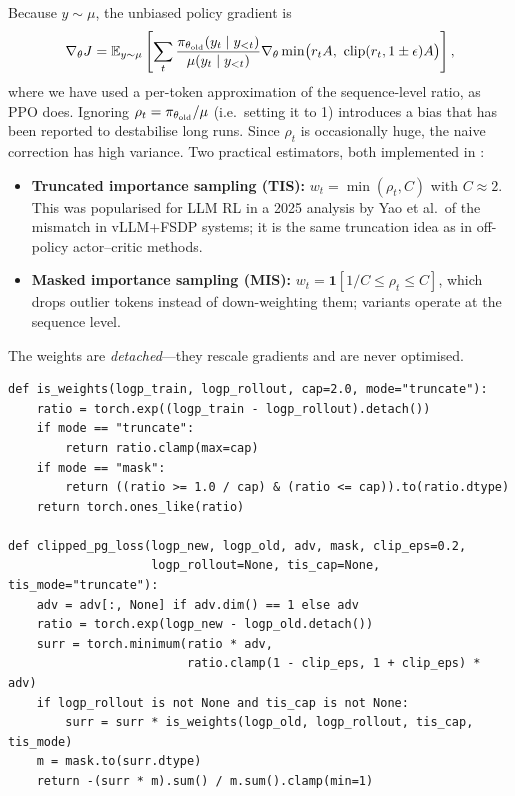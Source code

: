 Because $y\sim\mu$, the unbiased policy gradient is
\begin{equation}
\nabla_\theta J = \mathbb{E}_{y\sim\mu}\left[\sum_t \frac{\pi_{\theta_{\text{old}}}(y_t\mid y_{<t})}{\mu(y_t\mid y_{<t})}
\nabla_\theta \min\!\big(r_t A,\ \operatorname{clip}(r_t,1\pm\epsilon) A\big)\right],
\end{equation}
where we have used a per-token approximation of the sequence-level ratio, as PPO does.
Ignoring $\rho_t = \pi_{\theta_{\text{old}}}/\mu$ (i.e.\ setting it to 1) introduces a bias that has been
reported to destabilise long runs. Since $\rho_t$ is occasionally huge, the naive correction
has high variance. Two practical estimators, both implemented in
:
\begin{itemize}
\item \textbf{Truncated importance sampling (TIS):} $w_t = \min(\rho_t, C)$ with $C\approx 2$.
This was popularised for LLM RL in a 2025 analysis by Yao et al.\ of the mismatch in
vLLM+FSDP systems; it is the same truncation idea as in off-policy actor--critic methods.
\item \textbf{Masked importance sampling (MIS):} $w_t = \mathbf{1}[1/C\le\rho_t\le C]$, which
drops outlier tokens instead of down-weighting them; variants operate at the sequence level.
\end{itemize}
The weights are \emph{detached}---they rescale gradients and are never optimised.

\begin{lstlisting}[caption={Clipped surrogate with truncated importance-sampling correction.},
label={lst:rlsys:tis}]
def is_weights(logp_train, logp_rollout, cap=2.0, mode="truncate"):
    ratio = torch.exp((logp_train - logp_rollout).detach())
    if mode == "truncate":
        return ratio.clamp(max=cap)
    if mode == "mask":
        return ((ratio >= 1.0 / cap) & (ratio <= cap)).to(ratio.dtype)
    return torch.ones_like(ratio)

def clipped_pg_loss(logp_new, logp_old, adv, mask, clip_eps=0.2,
                    logp_rollout=None, tis_cap=None, tis_mode="truncate"):
    adv = adv[:, None] if adv.dim() == 1 else adv
    ratio = torch.exp(logp_new - logp_old.detach())
    surr = torch.minimum(ratio * adv,
                         ratio.clamp(1 - clip_eps, 1 + clip_eps) * adv)
    if logp_rollout is not None and tis_cap is not None:
        surr = surr * is_weights(logp_old, logp_rollout, tis_cap, tis_mode)
    m = mask.to(surr.dtype)
    return -(surr * m).sum() / m.sum().clamp(min=1)
\end{lstlisting}

